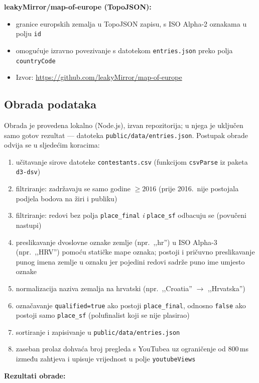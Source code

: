 \documentclass[a4paper,11pt]{article}
\begin{document}
\textbf{leakyMirror/map-of-europe (TopoJSON):}
\begin{itemize}
  \item granice europskih zemalja u TopoJSON zapisu, s ISO Alpha-2 oznakama u polju \texttt{id}
  \item omogućuje izravno povezivanje s datotekom \texttt{entries.json} preko polja \texttt{countryCode}
  \item Izvor: \url{https://github.com/leakyMirror/map-of-europe}
\end{itemize}

\subsection{Obrada podataka}

Obrada je provedena lokalno (Node.js), izvan repozitorija; u njega je uključen samo gotov rezultat --- datoteka \texttt{public/data/entries.json}. Postupak obrade odvija se u sljedećim koracima:

\begin{enumerate}
  \item učitavanje sirove datoteke \texttt{contestants.csv} (funkcijom \texttt{csvParse} iz paketa \texttt{d3-dsv})
  \item filtriranje: zadržavaju se samo godine $\geq 2016$ (prije 2016.\ nije postojala podjela bodova na žiri i publiku)
  \item filtriranje: redovi bez polja \texttt{place\_final} \emph{i} \texttt{place\_sf} odbacuju se (povučeni nastupi)
  \item preslikavanje dvoslovne oznake zemlje (npr.\ ,,hr'') u ISO Alpha-3 (npr.\ ,,HRV'') pomoću statičke mape oznaka; postoji i pričuvno preslikavanje punog imena zemlje u oznaku jer pojedini redovi sadrže puno ime umjesto oznake
  \item normalizacija naziva zemalja na hrvatski (npr.\ ,,Croatia'' $\to$ ,,Hrvatska'')
  \item označavanje \texttt{qualified=true} ako postoji \texttt{place\_final}, odnosno \texttt{false} ako postoji samo \texttt{place\_sf} (polufinalist koji se nije plasirao)
  \item sortiranje i zapisivanje u \texttt{public/data/entries.json}
  \item zaseban prolaz dohvaća broj pregleda s YouTubea uz ograničenje od 800\,ms između zahtjeva i upisuje vrijednost u polje \texttt{youtubeViews}
\end{enumerate}

\noindent\textbf{Rezultati obrade:}
\end{document}
